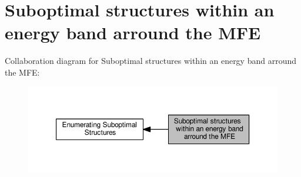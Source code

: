 \hypertarget{group__subopt__wuchty}{}\section{Suboptimal structures within an energy band arround the M\+F\+E}
\label{group__subopt__wuchty}
Collaboration diagram for Suboptimal structures within an energy band arround the M\+F\+E\+:
\nopagebreak
\begin{figure}[H]
\begin{center}
\leavevmode
\includegraphics[width=350pt]{group__subopt__wuchty}
\end{center}
\end{figure}

